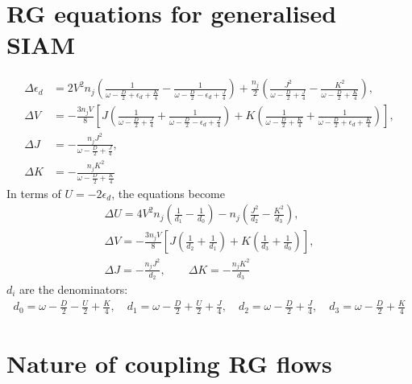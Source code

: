 \documentclass{report}
\numberwithin{equation}{section}
\begin{document}
\section{RG equations for generalised SIAM}
\begin{equation}\begin{aligned}
	\Delta \epsilon_d &= 2V^2 n_j\left(\frac{1}{\omega - \frac{D}{2} + \epsilon_d + \frac{K}{4}} - \frac{1}{\omega - \frac{D}{2} - \epsilon_d + \frac{J}{4}}\right) + \frac{n_j}{2}\left(\frac{J^2}{\omega - \frac{D}{2} + \frac{J}{4}} - \frac{K^2}{\omega - \frac{D}{2} + \frac{K}{4}}\right),\\
	\Delta V &= -\frac{3n_j V}{8}\left[J\left(\frac{1}{\omega - \frac{D}{2} + \frac{J}{4}} + \frac{1}{\omega - \frac{D}{2} - \epsilon_d + \frac{J}{4}}\right) + K \left(\frac{1}{\omega - \frac{D}{2} + \frac{K}{4}} + \frac{1}{\omega - \frac{D}{2} + \epsilon_d + \frac{K}{4}}\right)\right],\\
	\Delta J &= -\frac{n_j J^2}{\omega - \frac{D}{2} + \frac{J}{4}},\\ 
	\Delta K &= -\frac{n_j K^2}{\omega - \frac{D}{2} + \frac{K}{4}}
\end{aligned}\end{equation}
In terms of \(U = -2\epsilon_d\), the equations become
\begin{gather}
	\Delta U = 4V^2 n_j\left(\frac{1}{d_1} - \frac{1}{d_0}\right) - n_j\left(\frac{J^2}{d_2} - \frac{K^2}{d_3}\right),\\
	\Delta V = -\frac{3n_j V}{8}\left[J\left(\frac{1}{d_2} + \frac{1}{d_1}\right) + K \left(\frac{1}{d_3} + \frac{1}{d_0}\right)\right],\\
	\Delta J = -\frac{n_j J^2}{d_2}, \quad\quad\Delta K = -\frac{n_j K^2}{d_3}
\end{gather}
\(d_i\) are the denominators:
\begin{equation}\begin{aligned}
	\label{denominators}
	d_0 = \omega - \frac{D}{2} - \frac{U}{2} + \frac{K}{4}, \quad d_1 = \omega - \frac{D}{2} + \frac{U}{2} + \frac{J}{4}, \quad d_2 = \omega - \frac{D}{2} + \frac{J}{4}, \quad d_3 = \omega - \frac{D}{2} + \frac{K}{4}
\end{aligned}\end{equation}

\section{Nature of coupling RG flows}
\end{document}
